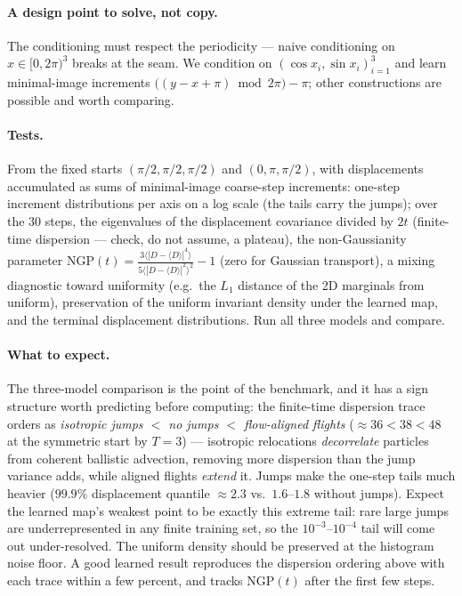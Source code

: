 \documentclass[11pt]{article}
\begin{document}
\paragraph{A design point to solve, not copy.} The conditioning must
respect the periodicity --- naive conditioning on $x\in[0,2\pi)^3$
breaks at the seam. We condition on $(\cos x_i,\sin x_i)_{i=1}^3$ and
learn minimal-image increments
$\bigl((y-x+\pi)\bmod 2\pi\bigr)-\pi$; other constructions are possible
and worth comparing.

\paragraph{Tests.} From the fixed starts $(\pi/2,\pi/2,\pi/2)$ and
$(0,\pi,\pi/2)$, with displacements accumulated as sums of minimal-image
coarse-step increments: one-step increment distributions per axis on a
log scale (the tails carry the jumps); over the $30$ steps, the
eigenvalues of the displacement covariance divided by $2t$ (finite-time
dispersion --- check, do not assume, a plateau), the non-Gaussianity
parameter
$\mathrm{NGP}(t)=\tfrac{3\langle|D-\langle D\rangle|^4\rangle}
{5\langle|D-\langle D\rangle|^2\rangle^2}-1$ (zero for Gaussian
transport), a mixing diagnostic toward uniformity (e.g.\ the $L_1$
distance of the 2D marginals from uniform), preservation of the uniform
invariant density under the learned map, and the terminal displacement
distributions. Run all three models and compare.

\paragraph{What to expect.} The three-model comparison is the point of
the benchmark, and it has a sign structure worth predicting before
computing: the finite-time dispersion trace orders as \emph{isotropic
jumps $<$ no jumps $<$ flow-aligned flights} ($\approx36<38<48$ at the
symmetric start by $T=3$) --- isotropic relocations \emph{decorrelate}
particles from coherent ballistic advection, removing more dispersion
than the jump variance adds, while aligned flights \emph{extend} it.
Jumps make the one-step tails much heavier ($99.9\%$ displacement
quantile $\approx2.3$ vs.\ $1.6$--$1.8$ without jumps). Expect the
learned map's weakest point to be exactly this extreme tail: rare large
jumps are underrepresented in any finite training set, so the
$10^{-3}$--$10^{-4}$ tail will come out under-resolved. The uniform
density should be preserved at the histogram noise floor. A good learned
result reproduces the dispersion ordering above with each trace within a
few percent, and tracks $\mathrm{NGP}(t)$ after the first few steps.
\end{document}
